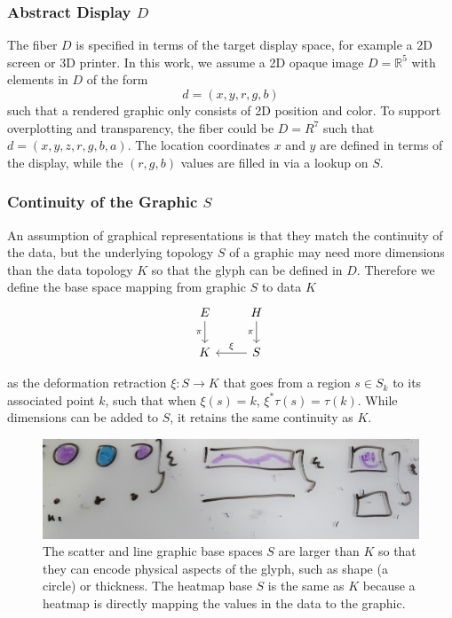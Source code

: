 \documentclass[../main.tex]{subfiles}
\begin{document}
\subsubsection{Abstract Display $D$}
\label{sec:graphic_fiber}
The fiber $D$ is specified in terms of the target display space, for example a 2D screen or 3D printer. In this work, we assume a 2D opaque image $D=\mathbb{R}^5$ with elements in $D$ of the form
\begin{equation}
    d = (x, y, r, g, b)
\end{equation}
such that a rendered graphic only consists of 2D position and color. To support overplotting and transparency, the fiber could be $D=R^{7}$ such that $d=(x, y, z, r, g, b, a)$. The location coordinates $x$ and $y$ are defined in terms of the display, while the $(r,g,b)$ values are filled in via a lookup on $S$. 

\subsubsection{Continuity of the Graphic $S$} 
\label{sec:graphic_base}
An assumption of graphical representations is that they match the continuity of the data\cite{tufteVisualDisplayQuantitative2001,friendlyBriefHistoryData2008}, but the underlying topology $S$ of a graphic may need more dimensions than the data topology $K$ so that the glyph can be defined in $D$. Therefore we define the base space mapping from graphic $S$ to data $K$ 
\begin{equation}
    \begin{tikzcd}
        E \arrow[d, "\pi"'] & H \arrow[d, "\pi"'] \\
        K                   & S \arrow[l, "\xi"']
        \end{tikzcd}
\end{equation}

 as the deformation retraction \cite{RetractionTopology2020} $\xi: S \rightarrow K$ that goes from a region $s \in S_{k}$ to its associated point $k$, such that when $\xi(s) = k$, $\xi^*\tau(s) = \tau(k)$. While dimensions can be added to $S$, it retains the same continuity as $K$.
 
\begin{figure}
    \includegraphics[width=1\textwidth]{figures/math/retraction_maps.png}
    \caption{The scatter and line graphic base spaces $S$ are larger than $K$ so that they can encode physical aspects of the glyph, such as shape (a circle) or thickness. The heatmap base $S$ is the same as $K$ because a heatmap is directly mapping the values in the data to the graphic.
    }
    \label{fig:graphic_retraction_map}
\end{figure}
\end{document}
